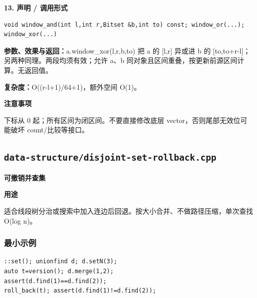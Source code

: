 \documentclass[UTF8,a4paper,10pt]{ctexart}
\newcommand{\TemplUsage}[1]{\textbf{用途}\par #1\par}
\newcommand{\TemplNote}[1]{\textbf{注意事项}\par #1\par}
\begin{document}
\noindent\begin{minipage}{\textwidth}
\textbf{13. 声明 / 调用形式}
\begin{lstlisting}
void window_and(int l,int r,Bitset &b,int to) const; window_or(...); window_xor(...)
\end{lstlisting}
\textbf{参数、效果与返回：}a.window\_xor(l,r,b,to) 把 a 的 [l,r] 异或进 b 的 [to,to+r-l]；另两种同理。两段均须有效；允许 a、b 同对象且区间重叠，按更新前源区间计算。无返回值。

\textbf{复杂度：}O((r-l+1)/64+1)，额外空间 O(1)。

\TemplNote{下标从 0 起；所有区间为闭区间。不要直接修改底层 vector，否则尾部无效位可能破坏 count/比较等接口。}
\end{minipage}\par\vspace{0.4em}
\clearpage
\subsection{\texttt{data-structure/disjoint-set-rollback.cpp}}
\textbf{可撤销并查集}\par
\TemplUsage{适合线段树分治或搜索中加入连边后回退。按大小合并、不做路径压缩，单次查找 O(log n)。}
\subsubsection*{最小示例}
\begin{lstlisting}
::set(); unionfind d; d.setN(3);
auto t=version(); d.merge(1,2);
assert(d.find(1)==d.find(2));
roll_back(t); assert(d.find(1)!=d.find(2));
\end{lstlisting}
\end{document}
